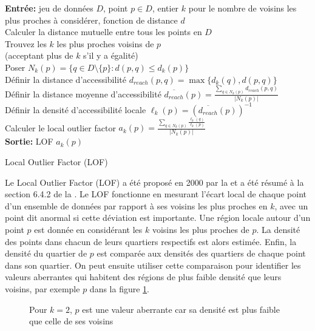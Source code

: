 \begin{algorithm}[ht]
\SetAlgoLined
\textbf{Entrée:} jeu de données $D$, point $p \in D$, entier $k$ pour le nombre de voisins les plus proches à considérer, fonction de distance $d$
\\ Calculer la distance mutuelle entre tous les points en $D$
\\
Trouvez les $k$ les plus proches voisins de $p$ 
\\(acceptant plus de $k$ s'il y a égalité)
\\ Poser $N_k(p) = \{ q \in D \setminus \{p\} : d(p, q) \leq d_k(p) \}$
\\ Définir la distance d'accessibilité
$d_{reach}(p,q) = \max\{d_k(q), d(p,q)\}$
\\ Définir la distance moyenne d'accessibilité $\overline{d_{reach}}(p) 
= \frac{\sum_{q \in N_k(p)} d_{reach}(p,q)}{\lvert N_k(p) \rvert}$
\\Définir la densité d'accessibilité locale
$\ell_k(p) = \left( \overline{d_{reach}}(p) \right)^{-1}$
\\Calculer le local outlier factor
$a_k(p)
= \frac{\sum_{q \in N_k(p)} \frac{\ell_k(q)}{\ell_k(p)}}{\lvert N_k(p) \rvert}$
\\ \textbf{Sortie:} LOF $a_k(p)$
\caption{Local Outlier Factor (LOF)}
\end{algorithm}

Le Local Outlier Factor (LOF) a été proposé en 2000 par la \cite{LOF} et a été résumé à la section 6.4.2 de la \cite{A10}.
Le LOF fonctionne en mesurant l'écart local de chaque point d'un ensemble de données par rapport à ses voisins les plus proches en $k$,
avec un point dit anormal si cette déviation est importante.
Une région locale autour d'un point $p$ est donnée en considérant les $k$ voisins les plus proches de $p$.
La densité des points dans chacun de leurs quartiers respectifs est alors estimée.
Enfin, la densité du quartier de $p$ est comparée aux densités des quartiers de chaque point dans son quartier.
On peut ensuite utiliser cette comparaison pour identifier les valeurs aberrantes qui habitent des régions de plus faible densité que leurs voisins,
par exemple $p$ dans la figure \ref{lofoutlier}.

\begin{figure}[H]
\centering
{}
\caption{Pour $k=2$, $p$ est une valeur aberrante car sa densité est plus faible que celle de ses voisins}
\label{lofoutlier}
\end{figure}

